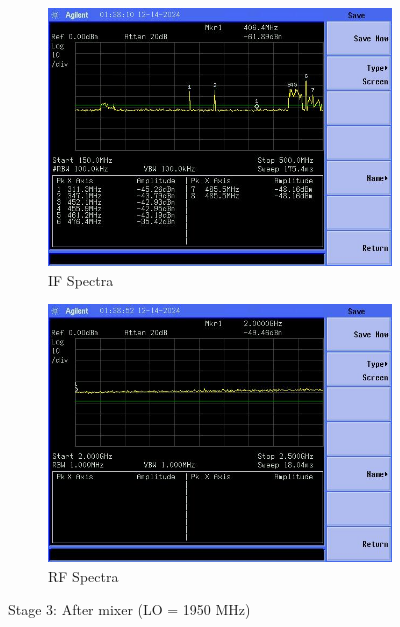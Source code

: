 \documentclass[letterpaper,12pt]{article}
\begin{document}
\begin{figure}[H]
	\begin{subfigure}[t]{.49\textwidth}
		\centering
		\includegraphics[width=\linewidth]{figures/receiver_spectra/3.mixer.lower}
		\caption{IF Spectra}
	  \end{subfigure}
	  \hfill
	  \begin{subfigure}[t]{.49\textwidth}
		\centering
		\includegraphics[width=\linewidth]{figures/receiver_spectra/3.mixer.upper}
		\caption{RF Spectra}
	  \end{subfigure}

	  \vspace{0.5cm}
	  \caption{Stage 3: After mixer (LO = 1950 MHz)}
\end{figure}
\end{document}
